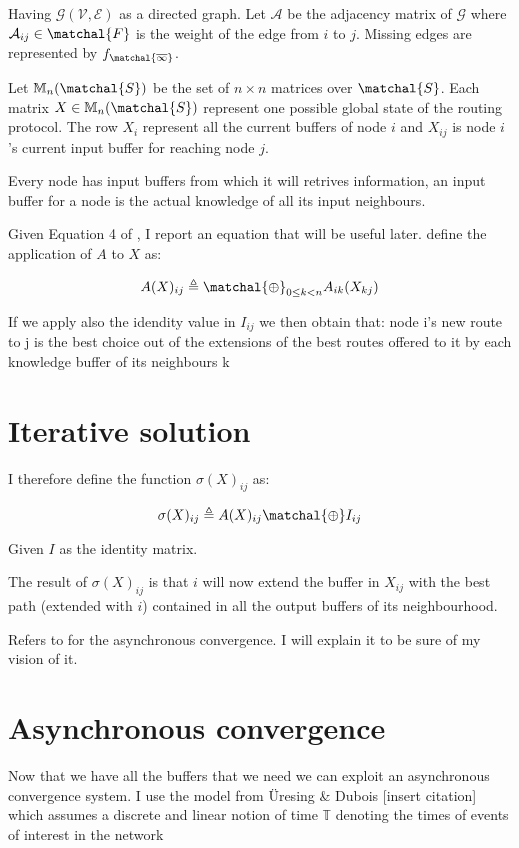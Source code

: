 \documentclass[10pt,conference,letterpaper]{IEEEtran}
\theoremstyle{definition}
\theoremstyle{remark}
\newcommand{\nodeset}{\ensuremath{\mathcal{V}}\xspace}
\newcommand{\edgeset}{\ensuremath{\mathcal{E}}\xspace}
\newcommand{\graphg}{\ensuremath{\mathcal{G}}\xspace}
\newcommand{\graph}{\ensuremath{\mathcal{\graphg(\nodeset,\edgeset)}}\xspace}
\newcommand{\semiringset}{\ensuremath{\matchal{S}}\xspace}
\newcommand{\semiringchoice}{\ensuremath{\matchal{\oplus}}\xspace}
\newcommand{\semiringfunctions}{\ensuremath{\matchal{F}}\xspace}
\newcommand{\semiringinvalid}{\ensuremath{\matchal{\overline{\rm \infty}}}\xspace}
\newcommand{\invalidfunction}{\ensuremath{f_\semiringinvalid}\xspace}
\newcommand{\setofmatrixes}{\ensuremath{\mathcal{\mathbb{M}}_n(\semiringset)}\xspace}
\newcommand{\sigmaop}[1]{\ensuremath{\mathcal{\sigma}(#1)_{ij}}\xspace}
\begin{document}
Having \graph as a directed graph.
Let $\mathcal{A}$ be the adjacency matrix of \graphg where $\mathcal{A}_{ij} \in \semiringfunctions$
is the weight of the edge from $i$ to $j$.
Missing edges are represented by \invalidfunction.

Let \setofmatrixes be the set of $n \times n$ matrices over \semiringset. Each matrix
$X \in \setofmatrixes$ represent one possible global state of the routing protocol.
The row $X_i$ represent all the current buffers of node $i$ and $X_{ij}$
is node $i$'s current input buffer for reaching node $j$.

Every node has input buffers from which it will retrives information, an input 
buffer for a node is the actual knowledge of all its input neighbours.

Given Equation \num{4} of \cite{daggitt2018rate}, I report an equation that 
will be useful later. 
define the application of $A$ to $X$ as:

$$ A(X)_{ij} \triangleq \semiringchoice_{0 \leq k < n} A_{ik}(X_{kj}) $$

If we apply also the idendity value in $I_{ij}$ we then obtain that:
node i’s new route to j is the best choice out of the extensions
of the best routes offered to it by each knowledge buffer of its neighbours k

\section{Iterative solution}
\label{sec:iterative solution}

I therefore define the function \sigmaop{X} as:

$$ \sigmaop{X} \triangleq A(X)_{ij} \semiringchoice I_{ij} $$

Given $I$ as the identity matrix.

The result of \sigmaop{X} is that $i$ will now extend the buffer in $X_{ij}$ 
with the best path (extended with $i$) contained in all the output buffers of
its neighbourhood.

Refers to \cite{daggitt2018asynchronous} for the asynchronous convergence.
I will explain it to be sure of my vision of it.

\section{Asynchronous convergence}

Now that we have all the buffers that we need we can exploit an asynchronous
convergence system.
I use the model from \"Uresing \& Dubois [insert citation] which assumes a discrete
and linear notion of time $\mathbb{T}$ denoting the times of events of interest
in the network
\end{document}
